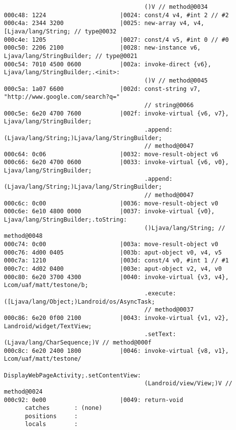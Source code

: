 \begin{lstlisting}
                                        ()V // method@0034
000c48: 1224                     |0024: const/4 v4, #int 2 // #2
000c4a: 2344 3200                |0025: new-array v4, v4, [Ljava/lang/String; // type@0032
000c4e: 1205                     |0027: const/4 v5, #int 0 // #0
000c50: 2206 2100                |0028: new-instance v6, Ljava/lang/StringBuilder; // type@0021
000c54: 7010 4500 0600           |002a: invoke-direct {v6}, Ljava/lang/StringBuilder;.<init>:
                                        ()V // method@0045
000c5a: 1a07 6600                |002d: const-string v7, "http://www.google.com/search?q="
                                        // string@0066
000c5e: 6e20 4700 7600           |002f: invoke-virtual {v6, v7}, Ljava/lang/StringBuilder;
                                        .append:(Ljava/lang/String;)Ljava/lang/StringBuilder;
                                        // method@0047
000c64: 0c06                     |0032: move-result-object v6
000c66: 6e20 4700 0600           |0033: invoke-virtual {v6, v0}, Ljava/lang/StringBuilder;
                                        .append:(Ljava/lang/String;)Ljava/lang/StringBuilder;
                                        // method@0047
000c6c: 0c00                     |0036: move-result-object v0
000c6e: 6e10 4800 0000           |0037: invoke-virtual {v0}, Ljava/lang/StringBuilder;.toString:
                                        ()Ljava/lang/String; // method@0048
000c74: 0c00                     |003a: move-result-object v0
000c76: 4d00 0405                |003b: aput-object v0, v4, v5
000c7a: 1210                     |003d: const/4 v0, #int 1 // #1
000c7c: 4d02 0400                |003e: aput-object v2, v4, v0
000c80: 6e20 3700 4300           |0040: invoke-virtual {v3, v4}, Lcom/uaf/matt/testone/b;
                                        .execute:([Ljava/lang/Object;)Landroid/os/AsyncTask;
                                        // method@0037
000c86: 6e20 0f00 2100           |0043: invoke-virtual {v1, v2}, Landroid/widget/TextView;
                                        .setText:(Ljava/lang/CharSequence;)V // method@000f
000c8c: 6e20 2400 1800           |0046: invoke-virtual {v8, v1}, Lcom/uaf/matt/testone/
                                        DisplayWebPageActivity;.setContentView:
                                        (Landroid/view/View;)V // method@0024
000c92: 0e00                     |0049: return-void
      catches       : (none)
      positions     :
      locals        :


\end{lstlisting}
